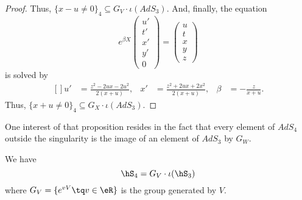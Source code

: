 \begin{proof}
Thus, $\{ x-u\neq 0 \}_4\subseteq G_V\cdot\iota(AdS_3)$. And, finally, the equation
\begin{equation}
	 e^{\beta X}\begin{pmatrix}
	u'	\\
	t'	\\
	x'	\\
	y'	\\
	0
\end{pmatrix}=
	 \begin{pmatrix}
	u	\\
	t	\\
	x	\\
	y	\\
	z
\end{pmatrix}
\end{equation}
is solved by
\begin{equation}
	\begin{aligned}[]
		u'&=\frac{ z^2-2ux-2u^2 }{ 2(x+u) },&x'&=\frac{ z^2+2ux+2x^2 }{ 2(x+u) },&\beta&=-\frac{ z }{ x+u }.
	\end{aligned}
\end{equation}
Thus, $\{ x+u\neq 0 \}_4\subseteq G_X\cdot\iota(AdS_3)$.

\end{proof}

One interest of that proposition resides in the fact that every element of $AdS_4$ outside the singularity is the image of an element of $AdS_3$ by $G_W$.


\begin{proposition}		\label{PropSingQTiV}
We have
\begin{equation}
	\hS_4=G_V\cdot\iota(\hS_3)
\end{equation}
where $G_V=\{  e^{vV}\tq v\in\eR \}$ is the group generated by $V$.
\end{proposition}

